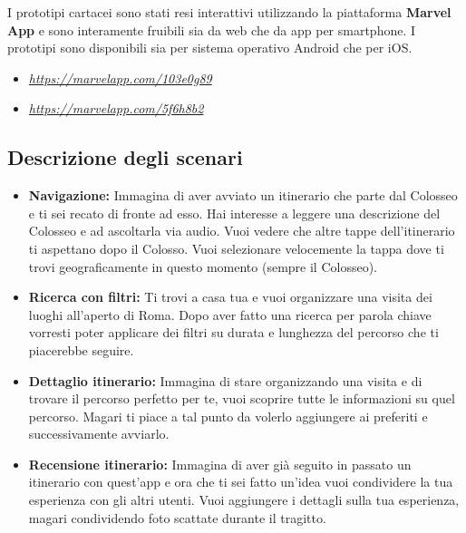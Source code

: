 I prototipi cartacei sono stati resi interattivi utilizzando la piattaforma \textbf{Marvel App} e sono interamente fruibili sia da web che da app per smartphone. I prototipi sono disponibili sia per sistema operativo Android che per iOS.

\begin{itemize}

\item{ \href{https://marvelapp.com/103e0g89}{\emph{https://marvelapp.com/103e0g89}}}
\item{ \href{https://marvelapp.com/5f6h8b2}{\emph{https://marvelapp.com/5f6h8b2}}}

\end{itemize}

\subsection{Descrizione degli scenari}

\begin{itemize}

\item \textbf{Navigazione:} Immagina di aver avviato un itinerario che parte dal Colosseo e ti sei recato di fronte ad esso. Hai interesse a leggere una descrizione del Colosseo e ad ascoltarla via audio. Vuoi vedere che altre tappe dell’itinerario ti aspettano dopo il Colosso. Vuoi selezionare velocemente la tappa dove ti trovi geograficamente in questo momento (sempre il Colosseo).

\item \textbf{Ricerca con filtri:} Ti trovi a casa tua e vuoi organizzare una visita dei luoghi all’aperto di Roma. Dopo aver fatto una ricerca per parola chiave vorresti poter applicare dei filtri su durata e lunghezza del percorso che ti piacerebbe seguire.

\item \textbf{Dettaglio itinerario:} Immagina di stare organizzando una visita  e di trovare il percorso perfetto per te, vuoi scoprire tutte le informazioni su quel percorso. Magari ti piace a tal punto da volerlo aggiungere ai preferiti e successivamente avviarlo.

\item \textbf{Recensione itinerario:} Immagina di aver già seguito in passato un itinerario con quest'app e ora che ti sei fatto un'idea vuoi condividere la tua esperienza con gli altri utenti. Vuoi aggiungere i dettagli sulla tua esperienza, magari condividendo foto scattate durante il tragitto.

\end{itemize}

